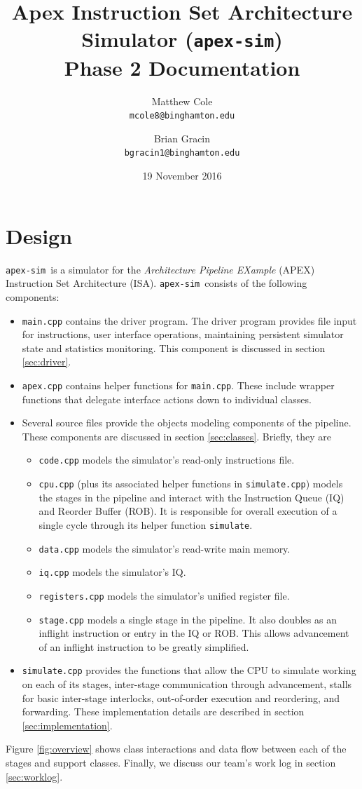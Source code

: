 \documentclass[12pt]{article}
\title{Apex Instruction Set Architecture Simulator (\texttt{apex-sim}) \\ Phase 2 Documentation}
\author{Matthew Cole \\ \texttt{mcole8@binghamton.edu}
\and
Brian Gracin \\ \texttt{bgracin1@binghamton.edu}}
\date{19 November 2016}
\newcommand{\codename}[0]{\texttt{apex-sim}~}
\begin{document}
\maketitle
\tableofcontents
\newpage
\listoffigures
\listoftables
\newpage
{}


\section{Design}
\codename is a simulator for the \textit{Architecture Pipeline EXample} (APEX) Instruction Set Architecture (ISA).
\codename consists of the following components:
\begin{itemize}
  \item \texttt{main.cpp} contains the driver program. The driver program provides file input for instructions, user interface operations, maintaining persistent simulator state and statistics monitoring. This component is discussed in section \ref{sec:driver}.
  \item \texttt{apex.cpp} contains helper functions for \texttt{main.cpp}. These include wrapper functions that delegate interface actions down to individual classes.
  \item Several source files provide the objects modeling components of the pipeline. These components are discussed in section \ref{sec:classes}. Briefly, they are
	\begin{itemize}
		\item \texttt{code.cpp} models the simulator's read-only instructions file.
		\item \texttt{cpu.cpp} (plus its associated helper functions in \texttt{simulate.cpp}) models the stages in the pipeline and interact with the Instruction Queue (IQ) and Reorder Buffer (ROB). It is responsible for overall execution of a single cycle through its helper function \texttt{simulate}. 
		\item \texttt{data.cpp} models the simulator's read-write main memory.
		\item \texttt{iq.cpp} models the simulator's IQ.
		\item \texttt{registers.cpp} models the simulator's unified register file.
		\item \texttt{stage.cpp} models a single stage in the pipeline. It also doubles as an inflight instruction or entry in the IQ or ROB. This allows advancement of an inflight instruction to be greatly simplified.
	\end{itemize}
	\item \texttt{simulate.cpp} provides the functions that allow the CPU to simulate working on each of its stages, inter-stage communication through advancement, stalls for basic inter-stage interlocks, out-of-order execution and reordering, and forwarding. These implementation details are described in section \ref{sec:implementation}.
\end{itemize}
Figure \ref{fig:overview} shows class interactions and data flow between each of the stages and support classes.
Finally, we discuss our team's work log in section \ref{sec:worklog}.
\end{document}
